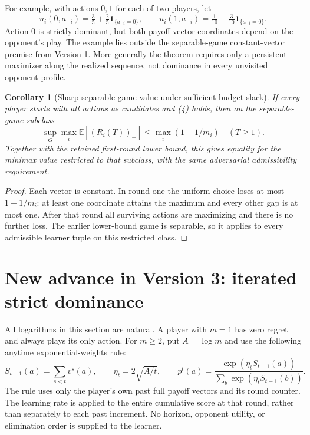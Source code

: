 \documentclass[11pt]{article}
\newtheorem{corollary}{Corollary}
\theoremstyle{definition}
\theoremstyle{remark}
\begin{document}
For example, with actions $0,1$ for each of two players, let
\[
 u_i(0,a_{-i})=\tfrac35+\tfrac25\mathbf1_{\{a_{-i}=0\}},
 \qquad
 u_i(1,a_{-i})=\tfrac1{10}+\tfrac3{10}\mathbf1_{\{a_{-i}=0\}}.
\]
Action $0$ is strictly dominant, but both payoff-vector coordinates depend
on the opponent's play. The example lies outside the separable-game
constant-vector premise from Version 1. More generally the theorem requires
only a persistent maximizer along the realized sequence, not dominance in
every unvisited opponent profile.

\begin{corollary}[Sharp separable-game value under sufficient budget slack]
If every player starts with all actions as candidates and (4) holds, then
on the separable-game subclass
\[
 \sup_G\max_i\mathbb E[(R_i(T))_+]
 \leq \max_i(1-1/m_i)
 \quad(T\geq1).
\]
Together with the retained first-round lower bound, this gives equality for
the minimax value restricted to that subclass, with the same adversarial
admissibility requirement.
\end{corollary}
\begin{proof}
Each vector is constant. In round one the uniform choice loses at most
$1-1/m_i$: at least one coordinate attains the maximum and every other gap
is at most one. After that round all surviving actions are maximizing and
there is no further loss. The earlier lower-bound game is separable, so it
applies to every admissible learner tuple on this restricted class.
\end{proof}

\section{New advance in Version 3: iterated strict dominance}
All logarithms in this section are natural. A player with $m=1$ has zero
regret and always plays its only action. For $m\geq2$, put $A=\log m$ and
use the following anytime exponential-weights rule:
\[
 S_{t-1}(a)=\sum_{s<t}v^s(a),\qquad
 \eta_t=2\sqrt{A/t},\qquad
 p^t(a)=\frac{\exp(\eta_t S_{t-1}(a))}
                 {\sum_b\exp(\eta_t S_{t-1}(b))}.       \tag{5}
\]
The rule uses only the player's own past full payoff vectors and its round
counter. The learning rate is applied to the entire cumulative score at
that round, rather than separately to each past increment. No horizon,
opponent utility, or elimination order is supplied to the learner.
\end{document}
